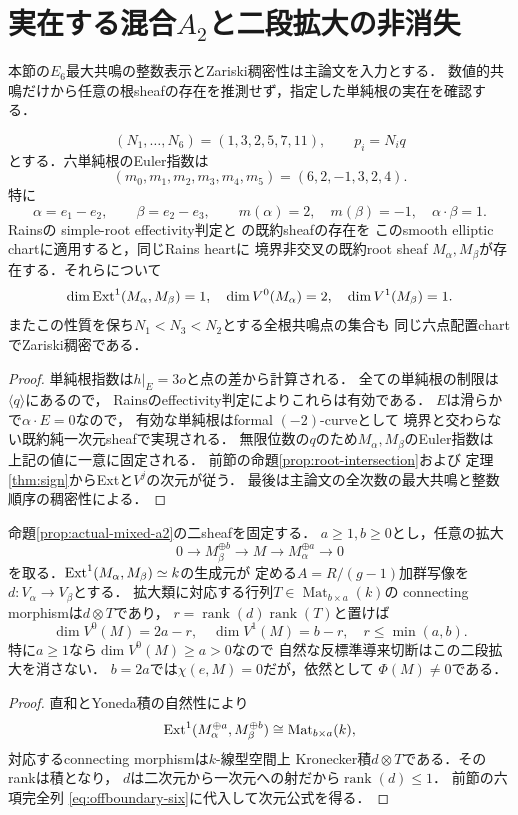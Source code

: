 \section{実在する混合$A_2$と二段拡大の非消失}\label{sec:dp-hearts2-mixed-a2}
本節の$E_6$最大共鳴の整数表示とZariski稠密性は主論文\cite{Hearts}を入力とする．
数値的共鳴だけから任意の根sheafの存在を推測せず，指定した単純根の実在を確認する．

\begin{proposition}[実在する正負の単純根sheaf]
\label{prop:actual-mixed-a2}
\[
 (N_1,\ldots,N_6)=(1,3,2,5,7,11),\qquad p_i=N_iq
\]
とする．六単純根のEuler指数は
\[
 (m_0,m_1,m_2,m_3,m_4,m_5)=(6,2,-1,3,2,4).
\]
特に
\[
 \alpha=e_1-e_2,\qquad\beta=e_2-e_3,\qquad
 m(\alpha)=2,\quad m(\beta)=-1,\quad
 \alpha\cdot\beta=1.
\]
Rains\cite[\S4, (4.14)--(4.15)]{RainsFiltered}の
simple-root effectivity判定と
\cite[\S9,\S11]{RainsBirational}の既約sheafの存在を
このsmooth elliptic chartに適用すると，同じRains heartに
境界非交叉の既約root sheaf
$M_\alpha,M_\beta$が存在する．それらについて
\[
 \dim\operatorname{Ext}^1(M_\alpha,M_\beta)=1,\quad
 \dim V^0(M_\alpha)=2,\quad
 \dim V^1(M_\beta)=1.
\]
またこの性質を保ち$N_1<N_3<N_2$とする全根共鳴点の集合も
同じ六点配置chartでZariski稠密である．
\end{proposition}
\begin{proof}
単純根指数は$h|_E=3o$と点の差から計算される．
全ての単純根の制限は$\langle q\rangle$にあるので，
Rainsのeffectivity判定によりこれらは有効である．
$E$は滑らかで$\alpha\cdot E=0$なので，
有効な単純根はformal $(-2)$-curveとして
境界と交わらない既約純一次元sheafで実現される．
無限位数の$q$のため$M_\alpha,M_\beta$のEuler指数は
上記の値に一意に固定される．
前節の命題\ref{prop:root-intersection}および
定理\ref{thm:sign}からExtと$V^j$の次元が従う．
最後は主論文\cite{Hearts}の全次数の最大共鳴と整数順序の稠密性による．
\end{proof}

\begin{proposition}[二段混合拡大全体での非消失]
\label{prop:a2-directsum}
命題\ref{prop:actual-mixed-a2}の二sheafを固定する．
$a\ge1,b\ge0$とし，任意の拡大
\[
0\longrightarrow M_\beta^{\oplus b}\longrightarrow M
 \longrightarrow M_\alpha^{\oplus a}\longrightarrow0
\]
を取る．$\operatorname{Ext}^1(M_\alpha,M_\beta)\simeq k$の生成元が
定める$A=R/(g-1)$加群写像を
$d:V_\alpha\to V_\beta$とする．
拡大類に対応する行列$T\in\operatorname{Mat}_{b\times a}(k)$の
connecting morphismは$d\otimes T$であり，
$r=\operatorname{rank}(d)\operatorname{rank}(T)$と置けば
\[
\boxed{
\dim V^0(M)=2a-r,\quad
\dim V^1(M)=b-r,\quad
r\le\min(a,b).}
\]
特に$a\ge1$なら$\dim V^0(M)\ge a>0$なので
自然な反標準導来切断はこの二段拡大を消さない．
$b=2a$では$\chi(e,M)=0$だが，依然として
$\Phi(M)\ne0$である．
\end{proposition}
\begin{proof}
直和とYoneda積の自然性により
\[
\operatorname{Ext}^1(M_\alpha^{\oplus a},M_\beta^{\oplus b})
 \cong\operatorname{Mat}_{b\times a}(k),
\]
対応するconnecting morphismは$k$-線型空間上
Kronecker積$d\otimes T$である．そのrankは積となり，
$d$は二次元から一次元への射だから$\operatorname{rank}(d)\le1$．
前節の六項完全列
\eqref{eq:offboundary-six}に代入して次元公式を得る．
\end{proof}

